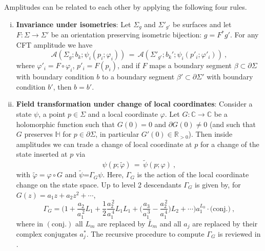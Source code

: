 \documentclass[11pt,a4paper]{article}
\numberwithin{equation}{section}
\begin{document}
\smallskip
Amplitudes can be related to each other by applying the following four rules. 
%
\begin{enumerate}[(i)]
    \item \textbf{Invariance under isometries}: 
    Let $\Sigma_g$ and $\Sigma'_{g'}$ be surfaces and let $F:\Sigma\to\Sigma'$ be an orientation preserving isometric bijection: $g = F^* g'$. For any CFT amplitude we have
    \begin{equation}
        \mathcal{A}\!\left(\Sigma_{g};b_k;\psi_i(p_i;\varphi_i)\right) 
        \,=\, 
        \mathcal{A}\!\left(\Sigma'_{g'};b_k';\psi_i(p'_i;\varphi'_i)\right) \ ,
    \end{equation}
    where $\varphi'_i = F\circ \varphi_i$, $p'_i= F(p_i)$, and if $F$ maps a boundary segment $\beta \subset \partial\Sigma$ with boundary condition $b$ to a boundary segment $\beta'\subset\partial\Sigma'$ with boundary condition $b'$, then $b=b'$.
    
    \item \textbf{Field transformation under change of local coordinates}: 
    Consider a state $\psi$, a point $p \in \Sigma$ and a local coordinate $\varphi$. 
    Let $G : \mathbb{C} \to \mathbb{C}$ 
    be a holomorphic function such that $G(0) = 0$ and $\partial G(0) \neq 0$ (and such that $G$ preserves $\mathbb{H}$ for $p \in \partial\Sigma$, in particular $G'(0) \in \mathbb{R}_{> 0}$). 
% 
    Then inside amplitudes we can trade a change of local coordinate at $p$ for a change of the state inserted at $p$ via
    \begin{equation}\label{eq:rule-ii-local-coord}
        \psi(p;\tilde\varphi) \,=\, \tilde{\psi}(p;\varphi) \ ,
    \end{equation}
    with 
    $\tilde\varphi = \varphi \circ G$ and
    $\tilde{\psi}$=$\Gamma_G\psi$. Here, $\Gamma_G$ is the action of the local coordinate change on the state space. Up to level 2 descendants $\Gamma_G$ is given by, for $G(z)=a_1 z+ a_2 z^2 + \cdots$, 
\begin{equation}\label{eq:Gamma_G-2nd-order}
    \Gamma_G = \Bigg(1 + \frac{a_2}{a_1^{\,2}} L_1
    + \frac12 \frac{a_2^{\,2}}{a_1^{\,4}} L_1 L_1
    + \Big(\frac{a_3}{a_1^{\,3}} - \frac{a_2^{\,2}}{a_1^{\,4}} \Big)L_2
    + \cdots \Bigg) a_1^{L_0} \cdot \big(\text{conj.}\big) \ ,
\end{equation}    
where in $(\text{conj.})$ all $L_m$ are replaced by $\bar L_m$ and all $a_j$ are replaced by their complex conjugates $a_j^*$.
The recursive procedure to compute $\Gamma_G$ is reviewed in \cite[Sec.\,6.2]{Brehm:2021wev}. 


\end{enumerate}
\end{document}
